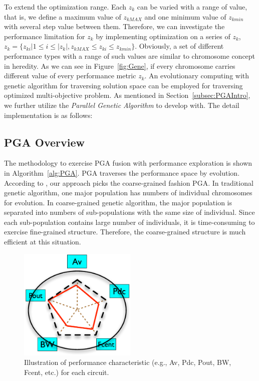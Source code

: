     To extend the optimization range. Each $z_k$ can be varied with a range of value, that is, we define a maximum value of $z_{kMAX}$ and one minimum value of $z_{kmin}$ with several step value between them. Therefore, we can investigate the performance limitation for $z_k$ by implementing optimization on a series of $z_k$, $z_k=\{z_{ki}| 1 \leq i \leq |z_k|, z_{kMAX} \leq z_{ki} \leq z_{kmin} \}$. Obviously, a set of different performance types with a range of such values are similar to chromosome concept in heredity. As we can see in Figure~\ref{fig:Gene}, if every chromosome carries different value of every performance metric $z_k$. An evolutionary computing with genetic algorithm for traversing solution space can be employed for traversing optimized multi-objective problem. As mentioned in Section~\ref{subsec:PGAIntro}, we further utilize the {\it Parallel Genetic Algorithm} to develop with. The detail implementation is as follows:

    


    \subsection{PGA Overview}

      The methodology to exercise PGA fusion with performance exploration is shown in Algorithm~\ref{alg:PGA}. PGA traverses the performance space by evolution. According to \cite{SurveyDistPGA1997}, our approach picks the coarse-grained fashion PGA. In traditional genetic algorithm, one major population has numbers of individual chromosomes for evolution. In coarse-grained genetic algorithm, the major population is separated into numbers of sub-populations with the same size of individual. Since each sub-population contains large number of individuals, it is time-consuming to exercise fine-grained structure. Therefore, the coarse-grained structure is much efficient at this situation. 


      \begin{figure}[t]
        \centering
        \includegraphics[width=0.5\textwidth]{Fig/Chapter2/MultiSpec.eps}
        \caption{Illustration of performance characteristic (e.g., Av, Pdc, Pout, BW, Fcent, etc.) for each circuit.} 
        \label{fig:MultiSpec}
      \end{figure}


